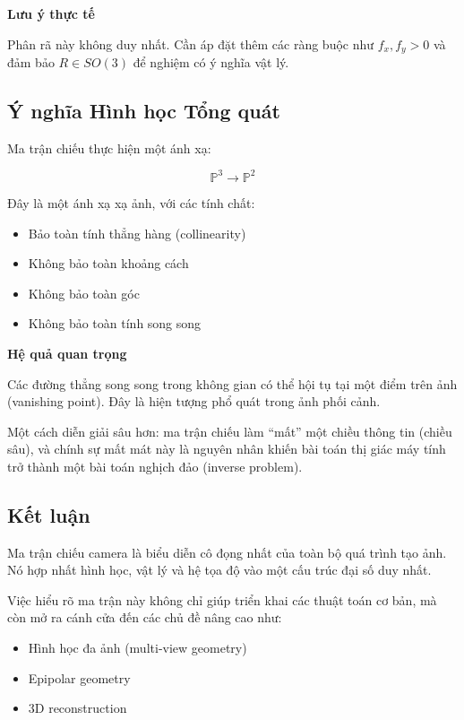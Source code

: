 \begin{mdframed}[style=infobox]
	\textbf{Lưu ý thực tế}
	
	Phân rã này không duy nhất. Cần áp đặt thêm các ràng buộc như $f_x, f_y > 0$ và đảm bảo $R \in SO(3)$ để nghiệm có ý nghĩa vật lý.
\end{mdframed}

\subsection{Ý nghĩa Hình học Tổng quát}
\label{subsec:projection_geometry}

Ma trận chiếu thực hiện một ánh xạ:

\[
\mathbb{P}^3 \rightarrow \mathbb{P}^2
\]

Đây là một ánh xạ xạ ảnh, với các tính chất:

\begin{itemize}
	\item Bảo toàn tính thẳng hàng (collinearity)
	\item Không bảo toàn khoảng cách
	\item Không bảo toàn góc
	\item Không bảo toàn tính song song
\end{itemize}

\begin{mdframed}[style=infobox]
	\textbf{Hệ quả quan trọng}
	
	Các đường thẳng song song trong không gian có thể hội tụ tại một điểm trên ảnh (vanishing point). Đây là hiện tượng phổ quát trong ảnh phối cảnh.
\end{mdframed}

Một cách diễn giải sâu hơn: ma trận chiếu làm “mất” một chiều thông tin (chiều sâu), và chính sự mất mát này là nguyên nhân khiến bài toán thị giác máy tính trở thành một bài toán nghịch đảo (inverse problem).

\subsection*{Kết luận}
\label{subsec:projection_conclusion}

Ma trận chiếu camera là biểu diễn cô đọng nhất của toàn bộ quá trình tạo ảnh. Nó hợp nhất hình học, vật lý và hệ tọa độ vào một cấu trúc đại số duy nhất.

Việc hiểu rõ ma trận này không chỉ giúp triển khai các thuật toán cơ bản, mà còn mở ra cánh cửa đến các chủ đề nâng cao như:
\begin{itemize}
	\item Hình học đa ảnh (multi-view geometry)
	\item Epipolar geometry
	\item 3D reconstruction
\end{itemize}

